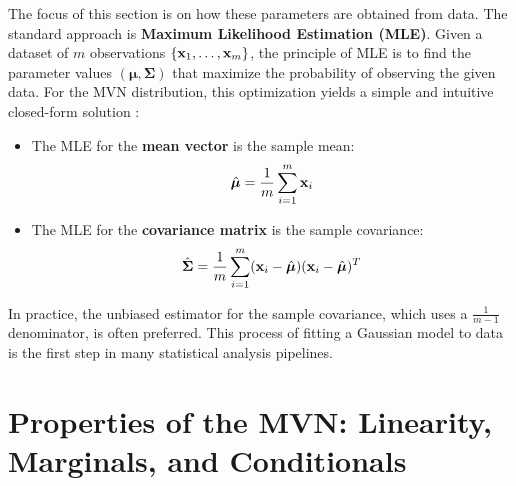 The focus of this section is on how these parameters are obtained from data. The standard approach is \textbf{Maximum Likelihood Estimation (MLE)}. Given a dataset of $m$ observations $\{\mathbf{x}_1, \dots, \mathbf{x}_m\}$, the principle of MLE is to find the parameter values $(\boldsymbol{\mu}, \boldsymbol{\Sigma})$ that maximize the probability of observing the given data. For the MVN distribution, this optimization yields a simple and intuitive closed-form solution \cite{Murphy2012ML}:
\begin{itemize}
    \item The MLE for the \textbf{mean vector} is the sample mean:
    \begin{equation}
        \hat{\boldsymbol{\mu}} = \frac{1}{m} \sum_{i=1}^m \mathbf{x}_i
    \end{equation}
    \item The MLE for the \textbf{covariance matrix} is the sample covariance:
    \begin{equation}
        \hat{\boldsymbol{\Sigma}} = \frac{1}{m} \sum_{i=1}^m (\mathbf{x}_i - \hat{\boldsymbol{\mu}})(\mathbf{x}_i - \hat{\boldsymbol{\mu}})^T
    \end{equation}
\end{itemize}
In practice, the unbiased estimator for the sample covariance, which uses a $\frac{1}{m-1}$ denominator, is often preferred. This process of fitting a Gaussian model to data is the first step in many statistical analysis pipelines.

\section{Properties of the MVN: Linearity, Marginals, and Conditionals}
\label{sec:mvn_properties}

